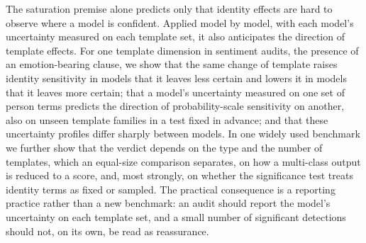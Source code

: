 \documentclass[runningheads]{llncs}
\begin{document}
The saturation premise alone predicts only that identity effects are hard to
observe where a model is confident. Applied model by model, with each model's
uncertainty measured on each template set, it also anticipates the direction of
template effects. For one template dimension in sentiment audits, the presence
of an emotion-bearing clause, we show that the same change of template raises
identity sensitivity in models that it leaves less certain and lowers it in
models that it leaves more certain; that a model's uncertainty measured on one
set of person terms predicts the direction of probability-scale sensitivity on
another, also on unseen template families in a test fixed in advance; and that
these uncertainty profiles differ sharply between models. In one widely used benchmark we further show that the
verdict depends on the type and the number of templates, which an equal-size
comparison separates, on how a multi-class output is reduced to a score, and,
most strongly, on whether the significance test treats identity terms as fixed
or sampled.
The practical
consequence is a reporting practice rather than a new benchmark: an audit should
report the model's uncertainty on each template set, and a small number of
significant detections should not, on its own, be read as reassurance.
\end{document}
